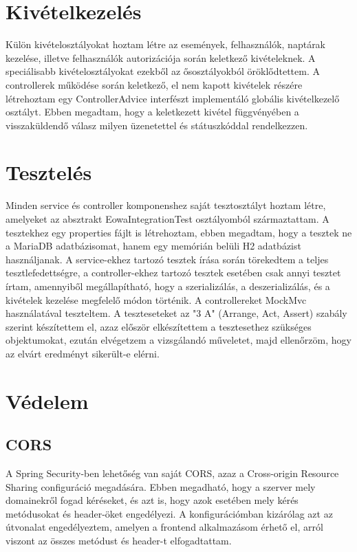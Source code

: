 \documentclass[a4paper,12pt]{report}
\theoremstyle{definition}
\theoremstyle{remark}
\begin{document}
\section{Kivételkezelés}

Külön kivételosztályokat hoztam létre az események, felhasználók, naptárak kezelése, illetve felhasználók autorizációja során keletkező kivételeknek. A speciálisabb kivételosztályokat ezekből az ősosztályokból öröklődtettem. A controllerek működése során keletkező, el nem kapott kivételek részére létrehoztam egy ControllerAdvice interfészt implementáló globális kivételkezelő osztályt. Ebben megadtam, hogy a keletkezett kivétel függvényében a visszaküldendő válasz milyen üzenetettel és státuszkóddal rendelkezzen.

\section{Tesztelés}

Minden service és controller komponenshez saját tesztosztályt hoztam létre, amelyeket az absztrakt EowaIntegrationTest osztályomból származtattam.  A tesztekhez egy properties fájlt is létrehoztam, ebben megadtam, hogy a tesztek ne a MariaDB adatbázisomat, hanem egy memórián belüli H2 adatbázist használjanak. A service-ekhez tartozó tesztek írása során törekedtem a teljes tesztlefedettségre, a controller-ekhez tartozó tesztek esetében csak annyi tesztet írtam, amennyiből megállapítható, hogy a szerializálás, a deszerializálás, és a kivételek kezelése megfelelő módon történik. A controllereket MockMvc használatával teszteltem. A teszteseteket az "3 A" (Arrange, Act, Assert) szabály szerint készítettem el, azaz először elkészítettem a tesztesethez szükséges objektumokat, ezután elvégetzem a vizsgálandó műveletet, majd ellenőrzöm, hogy az elvárt eredményt sikerült-e elérni.

\section{Védelem}

	\subsection{CORS}

A Spring Security-ben lehetőség van saját CORS, azaz a Cross-origin Resource Sharing configuráció megadására. Ebben megadható, hogy a szerver mely domainekről fogad kéréseket, és azt is, hogy azok esetében mely kérés metódusokat és header-öket engedélyezi. A konfigurációmban kizárólag azt az útvonalat engedélyeztem, amelyen a frontend alkalmazásom érhető el, arról viszont az összes metódust és header-t elfogadtattam.
\end{document}
